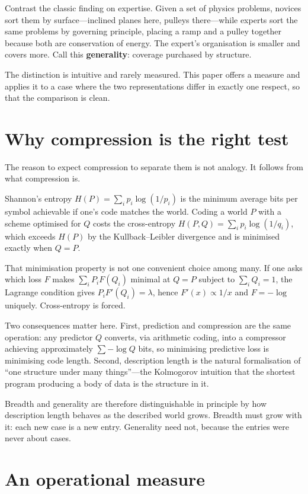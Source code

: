 \documentclass[11pt]{article}
\begin{document}
Contrast the classic finding on expertise. Given a set of physics problems,
novices sort them by surface---inclined planes here, pulleys there---while
experts sort the same problems by governing principle, placing a ramp and a
pulley together because both are conservation of energy. The expert's
organisation is smaller and covers more. Call this \textbf{generality}:
coverage purchased by structure.

The distinction is intuitive and rarely measured. This paper offers a measure
and applies it to a case where the two representations differ in exactly one
respect, so that the comparison is clean.

\section{Why compression is the right test}

The reason to expect compression to separate them is not analogy. It follows
from what compression is.

Shannon's entropy $H(P) = \sum_i p_i \log(1/p_i)$ is the minimum average bits
per symbol achievable if one's code matches the world. Coding a world $P$ with
a scheme optimised for $Q$ costs the cross-entropy
$H(P,Q) = \sum_i p_i \log(1/q_i)$, which exceeds $H(P)$ by the
Kullback--Leibler divergence and is minimised exactly when $Q = P$.

That minimisation property is not one convenient choice among many. If one
asks which loss $F$ makes $\sum_i P_i F(Q_i)$ minimal at $Q = P$ subject to
$\sum_i Q_i = 1$, the Lagrange condition gives $P_i F'(Q_i) = \lambda$, hence
$F'(x) \propto 1/x$ and $F = -\log$ uniquely. Cross-entropy is forced.

Two consequences matter here. First, prediction and compression are the same
operation: any predictor $Q$ converts, via arithmetic coding, into a compressor
achieving approximately $\sum -\log Q$ bits, so minimising predictive loss is
minimising code length. Second, description length is the natural formalisation
of ``one structure under many things''---the Kolmogorov intuition that the
shortest program producing a body of data is the structure in it.

Breadth and generality are therefore distinguishable in principle by how
description length behaves as the described world grows. Breadth must grow with
it: each new case is a new entry. Generality need not, because the entries were
never about cases.

\section{An operational measure}
\end{document}
